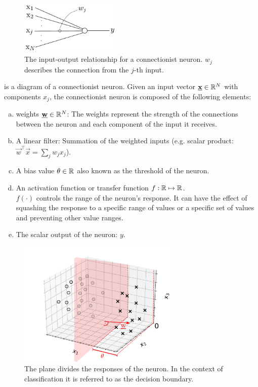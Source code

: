 \begin{frame}
    
    \begin{figure}[h]
        \centering
        \includegraphics[height=2.5cm]{img/linearNeuron_y.pdf}
        \caption{The input-output relationship for a connectionist neuron. $w_{j}$ describes the connection from the $j$-th input.}
        \label{fig:neuron_diagram}
    \end{figure}
    
     is a diagram of a connectionist neuron. Given an input vector $\underline{\mathbf{x}} \in \mathbb{R}^{N}$ with components $x_{j}$,
    the connectionist neuron is composed of the following elements:

    \begin{enumerate}[(a)]
        \item weights $\underline{\mathbf{w}} \in \mathbb{R}^{N}$: The weights represent the strength of the connections between the neuron and each component of the input it receives.\\
        \item A linear filter: Summation of the weighted inputs (e.g. scalar product: $\vec w^{\top} \vec x = \sum_{j} w_{j} x_{j}$).
        \item A bias value $\theta \in \mathbb{R}$ also known as the threshold of the neuron.
        \item An activation function or transfer function $f: \mathbb{R} \mapsto \mathbb{R}$. \\
        
        $f(\cdot)$ controls the range of the neuron's response. It can have the effect of squashing the response to a specific range of values or a specific set of values and preventing other value ranges.
        \item The scalar output of the neuron: $y$.
    \end{enumerate}
    
    \begin{figure}[h]
        \centering
        \includegraphics[height=6cm]{img/neuron_3d_grid_hyperplane.pdf}
        \caption{The plane divides the responses of the neuron. In the context of classification it is referred to as the decision boundary.}
        \label{fig:neuron_3d_grid_hyperplane}
    \end{figure}
    

\end{frame}
